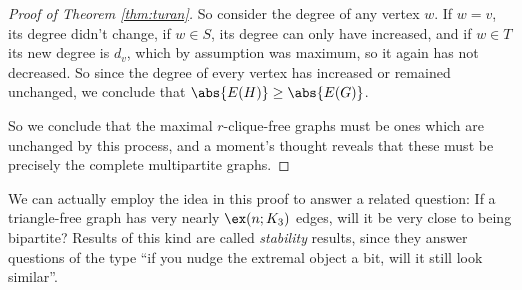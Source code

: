 \documentclass[nobib]{tufte-handout}
\begin{document}
\begin{proof}[Proof of Theorem \ref{thm:turan}]
    So consider the degree of any vertex $w$. If $w = v$, its degree didn't change, if $w \in S$, its degree can only have increased, and if $w \in T$ its new degree is $d_v$, which by assumption was maximum, so it again has not decreased. So since the degree of every vertex has increased or remained unchanged, we conclude that $\abs{E(H)} \geq \abs{E(G)}$.

    So we conclude that the maximal $r$-clique-free graphs must be ones which are unchanged by this process, and a moment's thought reveals that these must be precisely the complete multipartite graphs.
\end{proof}

We can actually employ the idea in this proof to answer a related question: If a triangle-free graph has very nearly $\ex(n; K_3)$ edges, will it be very close to being bipartite? Results of this kind are called \emph{stability} results, since they answer questions of the type ``if you nudge the extremal object a bit, will it still look similar''.
\end{document}
